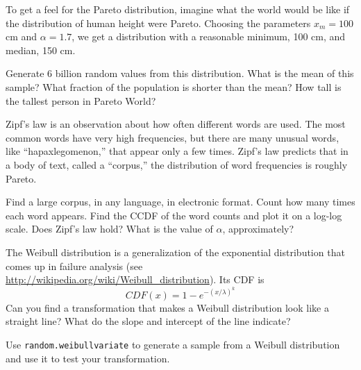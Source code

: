 \documentclass[12pt]{book}
\begin{document}
\begin{exercise}
To get a feel for the Pareto distribution, imagine what the world
would be like if the distribution of human height were Pareto.
Choosing the parameters $x_{m} = 100$ cm and $\alpha = 1.7$, we
get a distribution with a reasonable minimum, 100 cm,
and median, 150 cm.

Generate 6 billion random values from this distribution.  What is the
mean of this sample?  What fraction of the population is shorter than
the mean?  How tall is the tallest person in Pareto World?

\end{exercise}

\begin{exercise}
Zipf's law is an observation about how often different words are used.
The most common words have very high frequencies, but there are many
unusual words, like ``hapaxlegomenon,'' that appear only a few times.
Zipf's law predicts that in a body of text, called a ``corpus,'' the
distribution of word frequencies is roughly Pareto.

Find a large corpus, in any language, in electronic
format.  Count how many times each word appears.  Find the CCDF of the
word counts and plot it on a log-log scale.  Does Zipf's law hold?
What is the value of $\alpha$, approximately?

\end{exercise}

\begin{exercise}
\label{weibull}

The Weibull distribution is a generalization of the exponential
distribution that comes up in failure analysis
(see \url{http://wikipedia.org/wiki/Weibull_distribution}).  Its CDF is
%
\[ CDF(x) = 1 - e^{-(x / \lambda)^k} \]
%
Can you find a transformation that makes a Weibull distribution look
like a straight line?  What do the slope and intercept of the
line indicate?

Use {\tt random.weibullvariate} to generate a sample from a
Weibull distribution and use it to test your transformation.

\end{exercise}
\end{document}

